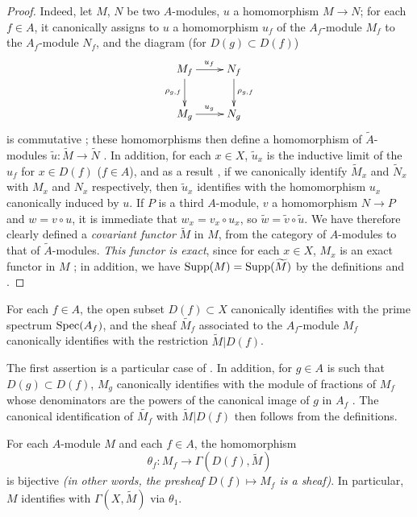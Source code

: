 \begin{proof}
\label{proof-1.1.3.5}
Indeed, let $M$, $N$ be two $A$-modules, $u$ a homomorphism $M\to N$; for each $f\in A$,
it canonically assigns to $u$ a homomorphism $u_f$ of the $A_f$-module $M_f$ to the
$A_f$-module $N_f$, and the diagram (for $D(g)\subset D(f)$)
\[
  \xymatrix{
    M_f\ar[r]^{u_f}\ar[d]_{\rho_{g,f}} & N_f\ar[d]^{\rho_{g,f}}\\
    M_g\ar[r]^{u_g} & N_g
  }
\]
is commutative ; these homomorphisms then define a homomorphism of
$\widetilde{A}$-modules $\widetilde{u}:\widetilde{M}\to\widetilde{N}$ . In
addition, for each $x\in X$, $\widetilde{u}_x$ is the inductive limit of the $u_f$ for
$x\in D(f)$ ($f\in A$), and as a result , if we canonically identify
$\widetilde{M}_x$ and $\widetilde{N}_x$ with $M_x$ and $N_x$ respectively, then $\widetilde{u}_x$
identifies with the homomorphism $u_x$ canonically induced by $u$. If $P$ is a third
$A$-module, $v$ a homomorphism $N\to P$ and $w=v\circ u$, it is immediate that
$w_x=v_x\circ u_x$, so $\widetilde{w}=\widetilde{v}\circ\widetilde{u}$. We have therefore
clearly defined a {\em covariant functor} $\widetilde{M}$ in $M$, from the category of
$A$-modules to that of $\widetilde{A}$-modules. {\em This functor is exact}, since for each
$x\in X$, $M_x$ is an exact functor in $M$ ; in addition, we have
${\mathop{\mathrm{Supp}}\nolimits}(M)={\mathop{\mathrm{Supp}}\nolimits}(\widetilde{M})$ by the definitions  and
.
\end{proof}

\begin{prop}[1.3.6]
\label{1.1.3.6}
For each $f\in A$, the open subset $D(f)\subset X$ canonically identifies with the prime
spectrum ${\mathop{\mathrm{Spec}}\nolimits}(A_f)$, and the sheaf $\widetilde{M_f}$ associated to the $A_f$-module
$M_f$ canonically identifies with the restriction $\widetilde{M}|D(f)$.
\end{prop}

The first assertion is a particular case of . In addition, for $g\in A$ is
such that $D(g)\subset D(f)$, $M_g$ canonically identifies with the module of fractions of
$M_f$ whose denominators are the powers of the canonical image of $g$ in $A_f$
. The canonical identification of $\widetilde{M_f}$ with
$\widetilde{M}|D(f)$ then follows from the definitions.

\begin{thm}[1.3.7]
\label{1.1.3.7}
For each $A$-module $M$ and each $f\in A$, the homomorphism
\[
  \theta_f:M_f\longrightarrow\Gamma(D(f),\widetilde{M})
\]
is bijective {\em (in other words, the presheaf $D(f)\mapsto M_f$ is a {\em sheaf})}. In
particular, $M$ identifies with $\Gamma(X,\widetilde{M})$ via $\theta_1$.
\end{thm}

